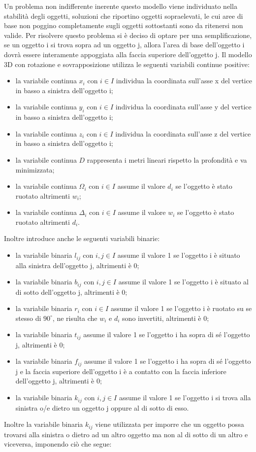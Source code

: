 Un problema non indifferente inerente questo modello viene individuato nella stabilità degli oggetti, soluzioni che riportino oggetti sopraelevati, le cui aree di base non poggino completamente sugli oggetti sottostanti sono da ritenersi non valide. Per risolvere questo problema si è deciso di optare per una semplificazione, se un oggetto i si trova sopra ad un oggetto j, allora l'area di base dell'oggetto i dovrà essere interamente appoggiata alla faccia superiore dell'oggetto j.
\newpage
Il modello 3D con rotazione e sovrapposizione utilizza le seguenti variabili continue positive:
\begin{itemize}
	\item la variabile continua $x_{i}$ con $i \in I$ individua la coordinata sull'asse x del vertice in basso a sinistra dell'oggetto i;
	\item la variabile continua $y_{i}$ con $i \in I$ individua la coordinata sull'asse y del vertice in basso a sinistra dell'oggetto i;
	\item la variabile continua $z_{i}$ con $i \in I$ individua la coordinata sull'asse z del vertice in basso a sinistra dell'oggetto i;
	\item la variabile continua $D$ rappresenta i metri lineari rispetto la profondità e va minimizzata;
	\item la variabile continua $\Omega_{i}$ con $i \in I$ assume il valore $d_i$ se l'oggetto è stato ruotato altrimenti $w_i$;
	\item la variabile continua $\Delta_{i}$ con $i \in I$ assume il valore $w_i$ se l'oggetto è stato ruotato altrimenti $d_i$.
\end{itemize}
Inoltre introduce anche le seguenti variabili binarie:
\begin{itemize}
	\item la variabile binaria $l_{ij}$ con $i,j \in I$ assume il valore 1 se l'oggetto i è situato alla sinistra dell'oggetto j, altrimenti è 0;
	\item la variabile binaria $b_{ij}$ con $i,j \in I$ assume il valore 1 se l'oggetto i è situato al di sotto dell'oggetto j, altrimenti è 0;
	\item la variabile binaria $r_{i}$ con $i \in I$ assume il valore 1 se l'oggetto i è ruotato su se stesso di $90^{\circ}$, ne risulta che $w_{i}$ e $d_{i}$ sono invertiti, altrimenti è 0;
	\item la variabile binaria $t_{ij}$ assume il valore 1 se l'oggetto i ha sopra di sé l'oggetto j, altrimenti è 0;
	\item la variabile binaria $f_{ij}$ assume il valore 1 se l'oggetto i ha sopra di sé l'oggetto j e la faccia superiore dell'oggetto i è a contatto con la faccia inferiore dell'oggetto j, altrimenti è 0;
	\item la variabile binaria $k_{ij}$ con $i,j \in I$ assume il valore 1 se l'oggetto i si trova alla sinistra o/e dietro un oggetto j oppure al di sotto di esso. 
\end{itemize}
\newpage
Inoltre la variabile binaria $k_{ij}$ viene utilizzata per imporre che un oggetto possa trovarsi alla sinistra o dietro ad un altro oggetto ma non al di sotto di un altro e viceversa, imponendo ciò che segue:

